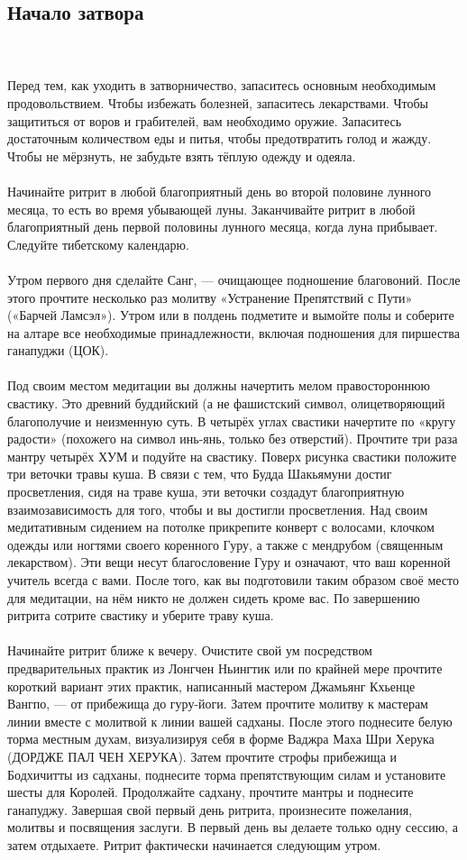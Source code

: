 \subsection{Начало затвора}
\\ \\ Перед тем, как уходить в затворничество, запаситесь основным необходимым продовольствием. Чтобы избежать болезней, запаситесь лекарствами. Чтобы защититься от воров и грабителей, вам необходимо оружие. Запаситесь достаточным количеством еды и питья, чтобы предотвратить голод и жажду. Чтобы не мёрзнуть, не забудьте взять тёплую одежду и одеяла.
\\ \\ Начинайте ритрит в любой благоприятный день во второй половине лунного месяца, то есть во время убывающей луны. Заканчивайте ритрит в любой благоприятный день первой половины лунного месяца, когда луна прибывает. Следуйте тибетскому календарю.
\\ \\ Утром первого дня сделайте Санг, — очищающее подношение благовоний. После этого прочтите несколько раз молитву «Устранение Препятствий с Пути» («Барчей Ламсэл»). Утром или в полдень подметите и вымойте полы и соберите на алтаре все необходимые принадлежности, включая подношения для пиршества ганапуджи (ЦОК).
\\ \\ Под своим местом медитации вы должны начертить мелом правостороннюю свастику. Это древний буддийский (а не фашистский символ, олицетворяющий благополучие и неизменную суть. В четырёх углах свастики начертите по «кругу радости» (похожего на символ инь-янь, только без отверстий). Прочтите три раза мантру четырёх ХУМ и подуйте на свастику. Поверх рисунка свастики положите три веточки травы куша. В связи с тем, что Будда Шакьямуни достиг просветления, сидя на траве куша, эти веточки создадут благоприятную взаимозависимость для того, чтобы и вы достигли просветления. Над своим медитативным сидением на потолке прикрепите конверт с волосами, клочком одежды или ногтями своего коренного Гуру, а также с мендрубом (священным лекарством). Эти вещи несут благословение Гуру и означают, что ваш коренной учитель всегда с вами. После того, как вы подготовили таким образом своё место для медитации, на нём никто не должен сидеть кроме вас. По завершению ритрита сотрите свастику и уберите траву куша.
\\ \\ Начинайте ритрит ближе к вечеру. Очистите свой ум посредством предварительных практик из Лонгчен Ньингтик или по крайней мере прочтите короткий вариант этих практик, написанный мастером Джамьянг Кхьенце Вангпо, — от прибежища до гуру-йоги. Затем прочтите молитву к мастерам линии вместе с молитвой к линии вашей садханы. После этого поднесите белую торма местным духам, визуализируя себя в форме Ваджра Маха Шри Херука (ДОРДЖЕ ПАЛ ЧЕН ХЕРУКА). Затем прочтите строфы прибежища и Бодхичитты из садханы, поднесите торма препятствующим силам и установите шесты для Королей. Продолжайте садхану, прочтите мантры и поднесите ганапуджу. Завершая свой первый день ритрита, произнесите пожелания, молитвы и посвящения заслуги. В первый день вы делаете только одну сессию, а затем отдыхаете. Ритрит фактически начинается следующим утром.

